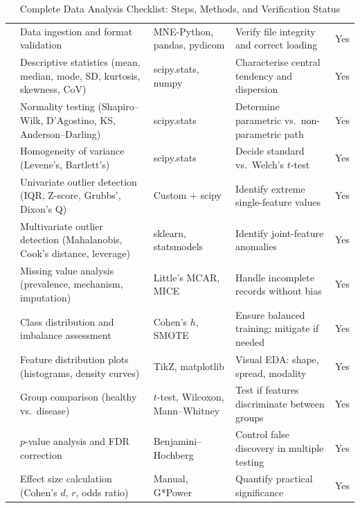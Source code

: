 \begingroup\singlespacing\tablefontsize
\begin{xltabular}
{\textwidth}{@{} c L L L c @{}}
\caption[Data analysis checklist]{Complete Data Analysis Checklist: Steps, Methods, and Verification Status}
\label{tab:analysis_checklist}\\
\toprule
{} &  &  &  &  \\
\midrule
\endfirsthead
\endhead
\bottomrule
{} & Data ingestion and format validation & MNE-Python, pandas, pydicom & Verify file integrity and correct loading & Yes \\
 & Descriptive statistics (mean, median, mode, SD, kurtosis, skewness, CoV) & scipy.stats, numpy & Characterise central tendency and dispersion & Yes \\
 & Normality testing (Shapiro--Wilk, D'Agostino, KS, Anderson--Darling) & scipy.stats & Determine parametric vs.\ non-parametric path & Yes \\
 & Homogeneity of variance (Levene's, Bartlett's) & scipy.stats & Decide standard vs.\ Welch's $t$-test & Yes \\
 & Univariate outlier detection (IQR, Z-score, Grubbs', Dixon's Q) & Custom + scipy & Identify extreme single-feature values & Yes \\
 & Multivariate outlier detection (Mahalanobis, Cook's distance, leverage) & sklearn, statsmodels & Identify joint-feature anomalies & Yes \\
 & Missing value analysis (prevalence, mechanism, imputation) & Little's MCAR, MICE & Handle incomplete records without bias & Yes \\
 & Class distribution and imbalance assessment & Cohen's $h$, SMOTE & Ensure balanced training; mitigate if needed & Yes \\
 & Feature distribution plots (histograms, density curves) & TikZ, matplotlib & Visual EDA: shape, spread, modality & Yes \\
 & Group comparison (healthy vs.\ disease) & $t$-test, Wilcoxon, Mann--Whitney & Test if features discriminate between groups & Yes \\
 & $p$-value analysis and FDR correction & Benjamini--Hochberg & Control false discovery in multiple testing & Yes \\
 & Effect size calculation (Cohen's $d$, $r$, odds ratio) & Manual, G*Power & Quantify practical significance & Yes \\

\end{xltabular}
